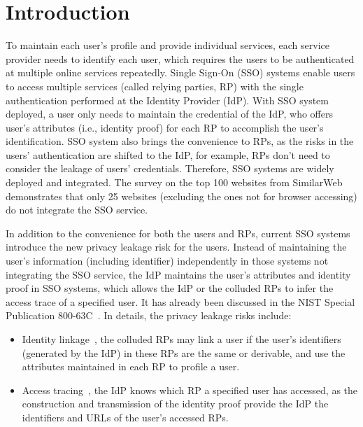 \section{Introduction}
\label{sec:intro}


To maintain each user's profile and provide individual services, each service provider needs to identify each user, which requires the users to be authenticated at multiple online services repeatedly.
Single Sign-On (SSO) systems enable users to access multiple services (called relying parties, RP) with the single authentication performed at the Identity Provider (IdP). With SSO system deployed, a user only needs to maintain the credential of the IdP, who offers user's attributes (i.e., identity proof) for each RP to accomplish the user's identification.
SSO system also brings the convenience to RPs, as the risks in the users' authentication are shifted to the IdP, for example, RPs don't need to consider the leakage of users' credentials.
Therefore, SSO systems are widely deployed and integrated.
The survey on the top 100 websites from SimilarWeb~\cite{similarweb} demonstrates that only 25 websites (excluding the ones not for browser accessing) do not integrate the SSO service.

In addition to the convenience for both the users and RPs, current SSO systems introduce the new privacy leakage risk for the users.
Instead of maintaining the user's information (including identifier) independently in those systems not integrating the SSO service,  the IdP maintains the user's attributes  and identity proof in SSO systems, which allows the IdP or the colluded RPs to infer the access trace of a specified user. It has already been discussed in the NIST Special Publication 800-63C~\cite{NIST}. In details, the privacy leakage risks include:
\begin{itemize}
\item Identity linkage~\cite{SAMLIdentifier,OpenIDConnect,NIST2017draft}, the colluded RPs may link a user if the user's identifiers (generated by the IdP) in these RPs are the same or derivable, and use the attributes maintained in each RP to profile a user.
\item Access tracing~\cite{NIST2017draft,persona,SPRESSO}, the IdP knows which RP a specified user has accessed, as the construction and transmission of the identity proof provide the IdP the identifiers and URLs of the user's accessed RPs.
\end{itemize}

